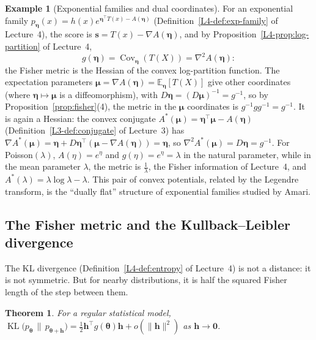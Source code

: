\documentclass[11pt]{article}
\newcommand{\norm}[1]{\lVert #1 \rVert}
\newcommand{\E}{\mathbb{E}}
\theoremstyle{definition}
\newtheorem{example}[definition]{Example}
\theoremstyle{plain}
\newtheorem{theorem}[definition]{Theorem}
\theoremstyle{remark}
\DeclareMathOperator{\Cov}{Cov}
\DeclareMathOperator{\KL}{KL}
\begin{document}
\begin{example}[Exponential families and dual coordinates]\label{ex:fisher-expfam}
    For an exponential family $p_{\boldsymbol{\eta}}(x) = h(x)e^{\boldsymbol{\eta}^\top T(x) - A(\boldsymbol{\eta})}$ (Definition~\ref{L4-def:exp-family} of Lecture~4), the score is $\mathbf{s} = T(x) - \nabla A(\boldsymbol{\eta})$, and by Proposition~\ref{L4-prop:log-partition} of Lecture~4,
    \[g(\boldsymbol{\eta}) = \Cov_{\boldsymbol{\eta}}(T(X)) = \nabla^2 A(\boldsymbol{\eta}):\]
    the Fisher metric is the Hessian of the convex log-partition function. The expectation parameters $\boldsymbol{\mu} = \nabla A(\boldsymbol{\eta}) = \E_{\boldsymbol{\eta}}[T(X)]$ give other coordinates (where $\boldsymbol{\eta} \mapsto \boldsymbol{\mu}$ is a diffeomorphism), with $D\boldsymbol{\eta} = (D\boldsymbol{\mu})^{-1} = g^{-1}$, so by Proposition~\ref{prop:fisher}(4), the metric in the $\boldsymbol{\mu}$ coordinates is $g^{-1}gg^{-1} = g^{-1}$. It is again a Hessian: the convex conjugate $A^*(\boldsymbol{\mu}) = \boldsymbol{\eta}^\top\boldsymbol{\mu} - A(\boldsymbol{\eta})$ (Definition~\ref{L3-def:conjugate} of Lecture~3) has $\nabla A^*(\boldsymbol{\mu}) = \boldsymbol{\eta} + D\boldsymbol{\eta}^\top(\boldsymbol{\mu} - \nabla A(\boldsymbol{\eta})) = \boldsymbol{\eta}$, so $\nabla^2A^*(\boldsymbol{\mu}) = D\boldsymbol{\eta} = g^{-1}$. For Poisson$(\lambda)$, $A(\eta) = e^\eta$ and $g(\eta) = e^\eta = \lambda$ in the natural parameter, while in the mean parameter $\lambda$, the metric is $\frac{1}{\lambda}$, the Fisher information of Lecture~4, and $A^*(\lambda) = \lambda\log\lambda - \lambda$. This pair of convex potentials, related by the Legendre transform, is the ``dually flat'' structure of exponential families studied by Amari.
\end{example}

\subsection{The Fisher metric and the Kullback--Leibler divergence}

The KL divergence (Definition~\ref{L4-def:entropy} of Lecture~4) is not a distance: it is not symmetric. But for nearby distributions, it is half the squared Fisher length of the step between them.

\begin{theorem}\label{thm:fisher-kl}
    For a regular statistical model, $\KL\big(p_{\boldsymbol{\theta}} \,\|\, p_{\boldsymbol{\theta} + \mathbf{h}}\big) = \frac{1}{2}\mathbf{h}^\top g(\boldsymbol{\theta})\mathbf{h} + o(\norm{\mathbf{h}}^2)$ as $\mathbf{h} \to \mathbf{0}$.
\end{theorem}
\end{document}
